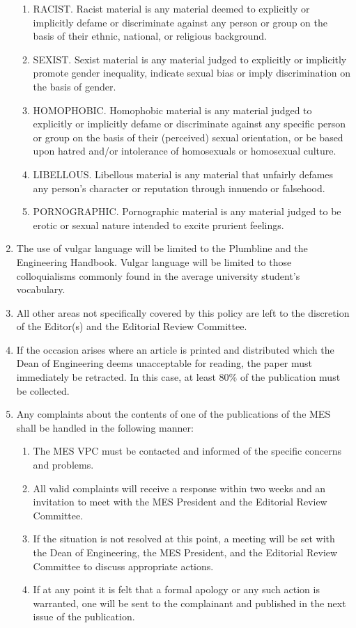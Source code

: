 \begin{enumerate}
  \begin{enumerate}
   \item
    RACIST. Racist material is any material deemed to explicitly or
    implicitly defame or discriminate against any person or group on the
    basis of their ethnic, national, or religious background.
   \item
    SEXIST. Sexist material is any material judged to explicitly or
    implicitly promote gender inequality, indicate sexual bias or imply
    discrimination on the basis of gender.
   \item
    HOMOPHOBIC. Homophobic material is any material judged to explicitly
    or implicitly defame or discriminate against any specific person or
    group on the basis of their (perceived) sexual orientation, or be
    based upon hatred and/or intolerance of homosexuals or homosexual
    culture.
   \item
    LIBELLOUS. Libellous material is any material that unfairly defames
    any person's character or reputation through innuendo or falsehood.
   \item
    PORNOGRAPHIC. Pornographic material is any material judged to be
    erotic or sexual nature intended to excite prurient feelings.
  \end{enumerate}
 \item
  The use of vulgar language will be limited to the Plumbline and the
  Engineering Handbook. Vulgar language will be limited to those
  colloquialisms commonly found in the average university student's
  vocabulary.
 \item
  All other areas not specifically covered by this policy are left to
  the discretion of the Editor(s) and the Editorial Review Committee.
 \item
  If the occasion arises where an article is printed and distributed
  which the Dean of Engineering deems unacceptable for reading, the
  paper must immediately be retracted. In this case, at least 80\% of
  the publication must be collected.
 \item
  Any complaints about the contents of one of the publications of the
  MES shall be handled in the following manner:

  \begin{enumerate}
   \item
    The MES VPC must be contacted and informed of the specific concerns
    and problems.
   \item
    All valid complaints will receive a response within two weeks and an
    invitation to meet with the MES President and the Editorial Review
    Committee.
   \item
    If the situation is not resolved at this point, a meeting will be
    set with the Dean of Engineering, the MES President, and the
    Editorial Review Committee to discuss appropriate actions.
   \item
    If at any point it is felt that a formal apology or any such action
    is warranted, one will be sent to the complainant and published in
    the next issue of the publication.

  \end{enumerate}
\end{enumerate}

